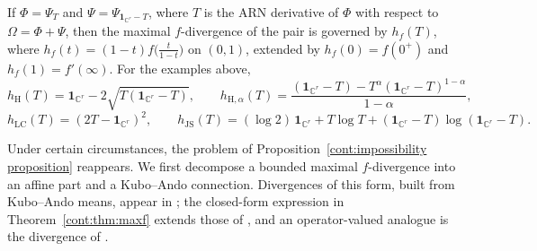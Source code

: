 \begin{remark}
If $\Phi=\Psi_T$ and $\Psi=\Psi_{\mathbf{1}_{\mathbb{C}^r}-T}$, where $T$ is the ARN derivative of $\Phi$ with respect to $\Omega=\Phi+\Psi$, then the maximal $f$-divergence of the pair is governed by $h_f(T)$, where $h_f(t)=(1-t)f\big(\tfrac{t}{1-t}\big)$ on $(0,1)$, extended by $h_f(0)=f(0^+)$ and $h_f(1)=f'(\infty)$. For the examples above,
\[
h_{\mathrm{H}}(T)=\mathbf{1}_{\mathbb{C}^r}-2\sqrt{T(\mathbf{1}_{\mathbb{C}^r}-T)},\qquad
h_{\mathrm{H},\alpha}(T)=\frac{(\mathbf{1}_{\mathbb{C}^r}-T)-T^\alpha(\mathbf{1}_{\mathbb{C}^r}-T)^{1-\alpha}}{1-\alpha},
\]
\[
h_{\mathrm{LC}}(T)=(2T-\mathbf{1}_{\mathbb{C}^r})^2,\qquad
h_{\mathrm{JS}}(T)=(\log 2)\,\mathbf{1}_{\mathbb{C}^r}+T\log T+(\mathbf{1}_{\mathbb{C}^r}-T)\log(\mathbf{1}_{\mathbb{C}^r}-T).
\]
\end{remark}
 
Under certain circumstances, the problem of Proposition~\ref{cont:impossibility proposition} reappears. We first decompose a bounded maximal $f$-divergence into an affine part and a Kubo--Ando connection. Divergences of this form, built from Kubo--Ando means, appear in \cite{PitrikVirosztek2020}; the closed-form expression in Theorem~\ref{cont:thm:maxf} extends those of \cite{KatariyaWilde2021,FangFawzi2021}, and an operator-valued analogue is the divergence of \cite[Definition~3.1]{Okayasu2026maxf}.
 
